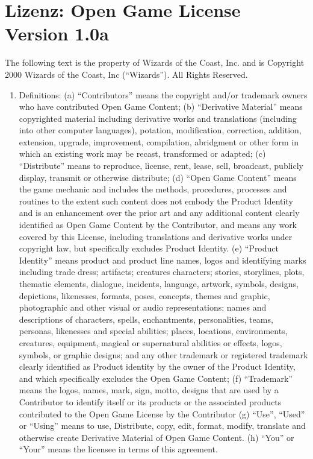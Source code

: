 \documentclass{tufte-handout}
\begin{document}
\clearpage

\section{Lizenz: Open Game License Version 1.0a}

\fontsize{7.5pt}{8pt}\selectfont

\begin{fullwidth}
The following text is the property of Wizards of the Coast, Inc. and
is Copyright 2000 Wizards of the Coast, Inc (``Wizards''). All Rights
Reserved.

\begin{enumerate}

\item Definitions: (a) ``Contributors'' means the copyright and/or
  trademark owners who have contributed Open Game Content; (b)
  ``Derivative Material'' means copyrighted material including
  derivative works and translations (including into other computer
  languages), potation, modification, correction, addition, extension,
  upgrade, improvement, compilation, abridgment or other form in which
  an existing work may be recast, transformed or adapted; (c)
  ``Distribute'' means to reproduce, license, rent, lease, sell,
  broadcast, publicly display, transmit or otherwise distribute; (d)
  ``Open Game Content'' means the game mechanic and includes the
  methods, procedures, processes and routines to the extent such
  content does not embody the Product Identity and is an enhancement
  over the prior art and any additional content clearly identified as
  Open Game Content by the Contributor, and means any work covered by
  this License, including translations and derivative works under
  copyright law, but specifically excludes Product Identity. (e)
  ``Product Identity'' means product and product line names, logos and
  identifying marks including trade dress; artifacts; creatures
  characters; stories, storylines, plots, thematic elements, dialogue,
  incidents, language, artwork, symbols, designs, depictions,
  likenesses, formats, poses, concepts, themes and graphic,
  photographic and other visual or audio representations; names and
  descriptions of characters, spells, enchantments, personalities,
  teams, personas, likenesses and special abilities; places,
  locations, environments, creatures, equipment, magical or
  supernatural abilities or effects, logos, symbols, or graphic
  designs; and any other trademark or registered trademark clearly
  identified as Product identity by the owner of the Product Identity,
  and which specifically excludes the Open Game Content; (f)
  ``Trademark'' means the logos, names, mark, sign, motto, designs
  that are used by a Contributor to identify itself or its products or
  the associated products contributed to the Open Game License by the
  Contributor (g) ``Use'', ``Used'' or ``Using'' means to use,
  Distribute, copy, edit, format, modify, translate and otherwise
  create Derivative Material of Open Game Content. (h) ``You'' or
  ``Your'' means the licensee in terms of this agreement.


\end{enumerate}
\end{fullwidth}
\end{document}
